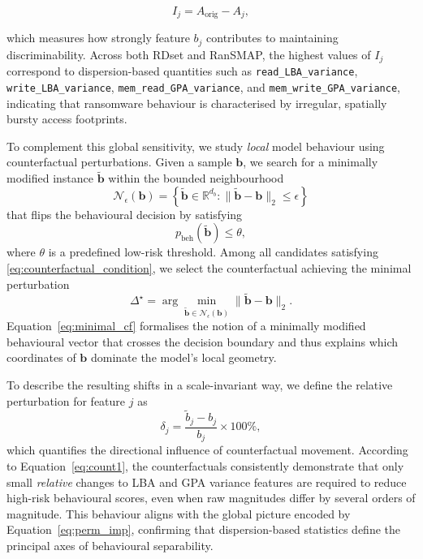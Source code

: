 \documentclass[lettersize,journal]{IEEEtran}
\begin{document}
\begin{equation}
    I_j = A_{\text{orig}} - A_j ,
\label{eq:perm_imp}
\end{equation}

which measures how strongly feature $b_j$ contributes to maintaining discriminability. Across both RDset and RanSMAP, the highest values of $I_j$ correspond to dispersion-based quantities such as \texttt{read\_LBA\_variance}, \texttt{write\_LBA\_variance}, \texttt{mem\_read\_GPA\_variance}, and \texttt{mem\_write\_GPA\_variance}, indicating that ransomware behaviour is characterised by irregular, spatially bursty access footprints.

To complement this global sensitivity, we study \emph{local} model behaviour using counterfactual perturbations. Given a sample $\mathbf{b}$, we search for a minimally modified instance $\tilde{\mathbf{b}}$ within the bounded neighbourhood
\begin{equation}
\mathcal{N}_{\epsilon}(\mathbf{b}) = \left\{\tilde{\mathbf{b}} \in \mathbb{R}^{d_b} : 
\|\tilde{\mathbf{b}} - \mathbf{b}\|_2 \le \epsilon \right\}
\label{eq:neighbourhood}
\end{equation}
that flips the behavioural decision by satisfying
\begin{equation}
p_{\mathrm{beh}}(\tilde{\mathbf{b}}) \le \theta ,
\label{eq:counterfactual_condition}
\end{equation}
where $\theta$ is a predefined low-risk threshold. Among all candidates satisfying \eqref{eq:counterfactual_condition}, we select the counterfactual achieving the minimal perturbation
\begin{equation}
\Delta^\star
=
\arg\min_{\tilde{\mathbf{b}} \in \mathcal{N}_{\epsilon}(\mathbf{b})}
\|\tilde{\mathbf{b}} - \mathbf{b}\|_2 .
\label{eq:minimal_cf}
\end{equation}
Equation~\eqref{eq:minimal_cf} formalises the notion of a minimally modified behavioural vector that crosses the decision boundary and thus explains which coordinates of $\mathbf{b}$ dominate the model's local geometry.

To describe the resulting shifts in a scale-invariant way, we define the relative perturbation for feature $j$ as
\begin{equation}
\delta_j
=
\frac{\tilde{b}_j - b_j}{b_j}\times 100\% ,
\label{eq:count1}
\end{equation}
which quantifies the directional influence of counterfactual movement. According to Equation~\eqref{eq:count1}, the counterfactuals consistently demonstrate that only small \emph{relative} changes to LBA and GPA variance features are required to reduce high-risk behavioural scores, even when raw magnitudes differ by several orders of magnitude. This behaviour aligns with the global picture encoded by Equation~\eqref{eq:perm_imp}, confirming that dispersion-based statistics define the principal axes of behavioural separability.
\end{document}
